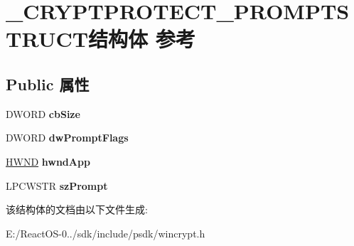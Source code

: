 \hypertarget{struct___c_r_y_p_t_p_r_o_t_e_c_t___p_r_o_m_p_t_s_t_r_u_c_t}{}\section{\+\_\+\+C\+R\+Y\+P\+T\+P\+R\+O\+T\+E\+C\+T\+\_\+\+P\+R\+O\+M\+P\+T\+S\+T\+R\+U\+C\+T结构体 参考}
\label{struct___c_r_y_p_t_p_r_o_t_e_c_t___p_r_o_m_p_t_s_t_r_u_c_t}
\subsection*{Public 属性}
\begin{DoxyCompactItemize}
\item 
\mbox{\label{struct___c_r_y_p_t_p_r_o_t_e_c_t___p_r_o_m_p_t_s_t_r_u_c_t_aa9f53658416a7901efab7d9441348b19}} 
D\+W\+O\+RD {\bfseries cb\+Size}
\item 
\mbox{\label{struct___c_r_y_p_t_p_r_o_t_e_c_t___p_r_o_m_p_t_s_t_r_u_c_t_ab1f44cc48fbc648968caa2c1b00722f4}} 
D\+W\+O\+RD {\bfseries dw\+Prompt\+Flags}
\item 
\mbox{\label{struct___c_r_y_p_t_p_r_o_t_e_c_t___p_r_o_m_p_t_s_t_r_u_c_t_a72a029101c794790d181fe6f0bdc16aa}} 
\hyperlink{interfacevoid}{H\+W\+ND} {\bfseries hwnd\+App}
\item 
\mbox{\label{struct___c_r_y_p_t_p_r_o_t_e_c_t___p_r_o_m_p_t_s_t_r_u_c_t_a7ccdae756c1b65410058849492f62ef1}} 
L\+P\+C\+W\+S\+TR {\bfseries sz\+Prompt}
\end{DoxyCompactItemize}


该结构体的文档由以下文件生成\+:\begin{DoxyCompactItemize}
\item 
E\+:/\+React\+O\+S-\/0../sdk/include/psdk/wincrypt.\+h\end{DoxyCompactItemize}
